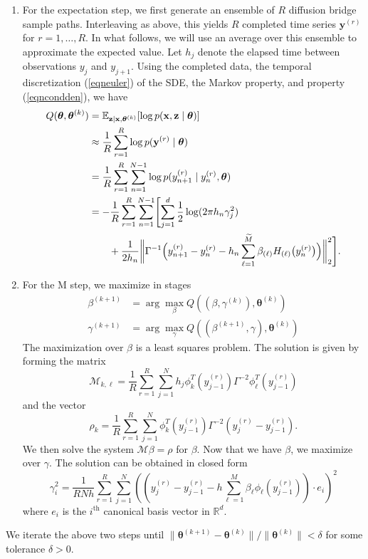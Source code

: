 \documentclass{article}
\newcommand{\btheta}{\ensuremath{\bm{\theta}}}
\newcommand{\bx}{\ensuremath{\mathbf{x}}}
\newcommand{\by}{\ensuremath{\mathbf{y}}}
\newcommand{\bz}{\ensuremath{\mathbf{z}}}
\begin{document}
\begin{enumerate}
\item For the expectation step, we first generate an ensemble of $R$ diffusion bridge sample paths.  Interleaving as above, this yields $R$ completed time series $\by^{(r)}$ for $r = 1, \ldots, R$.  In what follows, we will use an average over this ensemble to approximate the expected value.  Let $h_j$ denote the elapsed time between observations $y_j$ and $y_{j+1}$.  Using the completed data, the temporal discretization (\ref{eqneuler}) of the SDE, the Markov property, and property (\ref{eqncondden}), we have
\begin{align}
\label{eqnqfun}
Q(\btheta, \btheta^{(k)}) &= \mathbb{E}_{\bz \mid \bx, \btheta^{(k)}} [\log p(\bx, \bz \mid \btheta)] \\
 &\approx \frac{1}{R} \sum_{r=1}^R \log p(\by^{(r)} \mid \btheta) \nonumber \\
 &= \frac{1}{R} \sum_{r=1}^R \sum_{n=1}^{N-1} \log p(y_{n+1}^{(r)} \mid y_n^{(r)}, \btheta) \nonumber \\
 &= -\frac{1}{R} \sum_{r=1}^R \sum_{n=1}^{N-1} \Biggl[ \sum_{j=1}^d \frac{1}{2} \log(2 \pi h_n \gamma_j^2) \nonumber \\
 &\qquad + \frac{1}{2h_n} \biggl\| \Gamma^{-1} \Bigl(y_{n+1}^{(r)} - y_n^{(r)} - h_n \sum_{\ell=1}^{\widetilde{M}} \beta_{(\ell)} H_{(\ell)}\bigl(y_n^{(r)}\bigr)\Bigr) \biggr\|_2^2 \Biggr].
\end{align}
\item For the M step, we maximize in stages
\begin{align*}
\beta^{(k+1)} &= \arg \max_{\beta} Q( (\beta, \gamma^{(k)}), \btheta^{(k)}) \\
\gamma^{(k+1)} &= \arg \max_{\gamma} Q( (\beta^{(k+1)}, \gamma), \btheta^{(k)})
\end{align*}
The maximization over $\beta$ is a least squares problem.  The solution is given by forming the matrix
\begin{equation}
\label{eqnestM}
\mathcal{M}_{k,\ell} = \frac{1}{R} \sum_{r=1}^{R} \sum_{j=1}^N h_j \phi_k^T (y_{j-1}^{(r)}) \Gamma^{-2} \phi_\ell^T (y_{j-1}^{(r)})
\end{equation}
and the vector
\begin{equation}
\label{eqnestrho}
\rho_k = \frac{1}{R} \sum_{r=1}^{R} \sum_{j=1}^N \phi_k^T (y_{j-1}^{(r)}) \Gamma^{-2} (y_j^{(r)} - y_{j-1}^{(r)}).
\end{equation}
We then solve the system $\mathcal{M} \beta = \rho$ for $\beta$.  Now that we have $\beta$, we maximize over $\gamma$.  The solution can be obtained in closed form
\begin{equation}
\label{eqnestgamma}
\gamma_i^2 = \frac{1}{R N h} \sum_{r=1}^{R} \sum_{j=1}^N (( y_j^{(r)} - y_{j-1}^{(r)} - h \sum_{\ell=1}^M \beta_\ell \phi_\ell (y_{j-1}^{(r)}) ) \cdot e_i )^2
\end{equation}
where $e_i$ is the $i^\text{th}$ canonical basis vector in $\mathbb{R}^d$.
\end{enumerate}
We iterate the above two steps until $\| \btheta^{(k+1)} - \btheta^{(k)} \|/\| \btheta^{(k)} \| < \delta$ for some tolerance $\delta > 0$.
\end{document}
